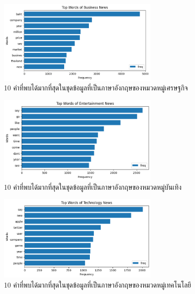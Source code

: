 \documentclass[12pt,oneside,openright,a4paper]{cpe-thai-project}
\begin{document}
\begin{itemize}
\begin{figure}[!ht]
          \includegraphics[width=0.7\textwidth]{./img/eng_stat/bus_bar.png}
          \caption{10 คำที่พบได้มากที่สุดในชุดข้อมูลที่เป็นภาษาอังกฤษของหมวดหมู่เศรษฐกิจ}\label{fig:bus_bar_eng}
        \end{figure}
        \newpage
        \begin{figure}[!ht]\centering
          \includegraphics[width=0.7\textwidth]{./img/eng_stat/ent_bar.png}
          \caption{10 คำที่พบได้มากที่สุดในชุดข้อมูลที่เป็นภาษาอังกฤษของหมวดหมู่บันเทิง}\label{fig:ent_bar_eng}
        \end{figure}
        \begin{figure}[!ht]\centering
          \includegraphics[width=0.7\textwidth]{./img/eng_stat/tech_bar.png}
          \caption{10 คำที่พบได้มากที่สุดในชุดข้อมูลที่เป็นภาษาอังกฤษของหมวดหมู่เทคโนโลยี}\label{fig:tech_bar_eng}
        \end{figure}
    

\end{itemize}
\end{document}
